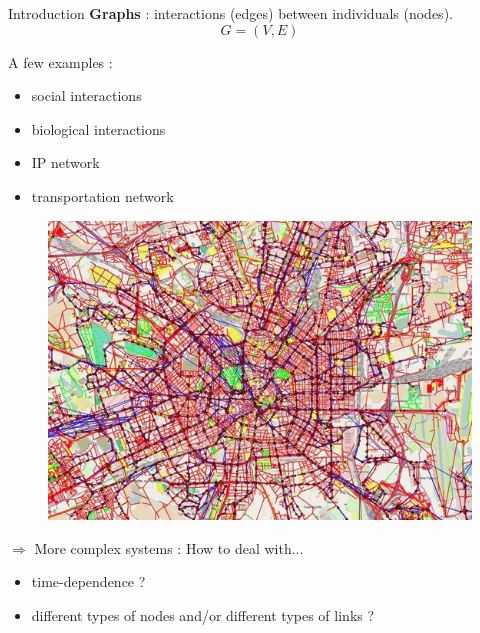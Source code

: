 \documentclass[15pt]{beamer}
\begin{document}
\begin{frame}{Introduction}
\textbf{Graphs} : interactions (edges) between individuals (nodes).
\[
	G=(V,E)
\]
\pause
\begin{minipage}{0.4\linewidth}
{\large A few examples :}
\begin{itemize}
    \item social interactions
    \item biological interactions
    \item IP network
    \item transportation network
\end{itemize}
\end{minipage}
\pause
\begin{minipage}{0.5\linewidth}
\begin{figure}
	\centering
    \includegraphics[width=\textwidth]{img/multimodalTransport.jpg}
    \label{fig:exmultitransport}
\end{figure}
\end{minipage}
\pause

$\Rightarrow$ {\large More complex systems : How to deal with...}
\begin{itemize}
    \item time-dependence ?
    \item different types of nodes and/or different types of links ?
\end{itemize}
\end{frame}
\end{document}
